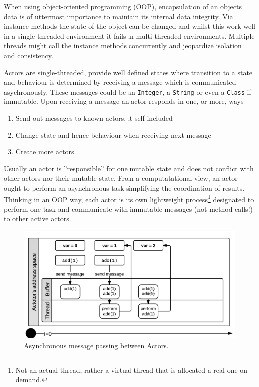 \documentclass[a4paper,12pt]{kth-mag}
\begin{document}
When using object-oriented programming (OOP), encapsulation of an objects data is of uttermost importance to maintain its internal data integrity. Via instance methods the state of the object can be changed and whilst this work well in a single-threaded environment it fails in multi-threaded environments. Multiple threads might call the instance methods concurrently and jeopardize isolation and consistency. 

Actors are single-threaded, provide well defined states where transition to a state and behaviour is determined by receiving a message which is communicated asychronously. These messages could be an \texttt{Integer}, a \texttt{String} or even a \texttt{Class} if immutable. Upon receiving a message an actor responds in one, or more, ways \cite{HO09}

\begin{enumerate}
\item Send out messages to known actors, it self included
\item Change state and hence behaviour when receiving next message
\item Create more actors
\end{enumerate}

Usually an actor is ''responsible'' for one mutable state and does not conflict with other actors nor their mutable state. From a computatational view, an actor ought to perform an asynchronous task simplifying the coordination of results. Thinking in an OOP way, each actor is its own lightweight process\footnote{Not an actual thread, rather a virtual thread that is allocated a real one on demand.} designated to perform one task and communicate with immutable messages (not method calls!) to other active actors.

\begin{figure}[H]
    \begin{center}
    \includegraphics{images/ActorsAdd.png}
    \end{center}
    \caption{Asynchronous message passing between Actors.}
    \label{fig:actorsAdd}
\end{figure}
\end{document}
